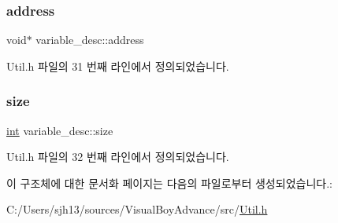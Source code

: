 \subsubsection{\texorpdfstring{address}{address}}
{\footnotesize\ttfamily void$\ast$ variable\+\_\+desc\+::address}



Util.\+h 파일의 31 번째 라인에서 정의되었습니다.

\mbox{\label{structvariable__desc_a4ba82f17bb7b2231d8884eebde322bca}} 
\subsubsection{\texorpdfstring{size}{size}}
{\footnotesize\ttfamily \mbox{\hyperlink{_util_8cpp_a0ef32aa8672df19503a49fab2d0c8071}{int}} variable\+\_\+desc\+::size}



Util.\+h 파일의 32 번째 라인에서 정의되었습니다.



이 구조체에 대한 문서화 페이지는 다음의 파일로부터 생성되었습니다.\+:\begin{DoxyCompactItemize}
\item 
C\+:/\+Users/sjh13/sources/\+Visual\+Boy\+Advance/src/\mbox{\hyperlink{_util_8h}{Util.\+h}}\end{DoxyCompactItemize}
